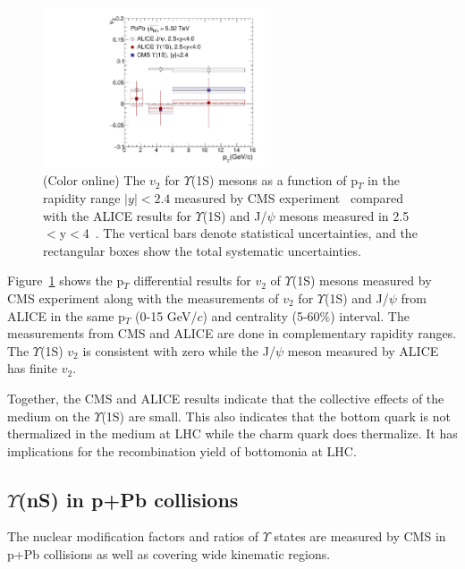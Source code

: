 \begin{figure}
  \begin{center}
\includegraphics[width=0.6\textwidth]{Figures/Fig11_CMS_ALICE_Y1S_5TeV_V2.pdf}
\caption{(Color online) The $v_{2}$ for $\Upsilon$(1S) mesons as a function of p$_{T}$ in the
  rapidity range $|y|<2.4$ measured by
  CMS experiment~\cite{CMS:2020efs} compared with the ALICE results for $\Upsilon$(1S)
  and J/$\psi$ mesons measured in 2.5$<$y$<$4~\cite{ALICE:2019pox}.
  The vertical bars denote statistical uncertainties,
  and the rectangular boxes show the total systematic uncertainties.
}
\label{fig:Upsilon1SV2Compare}
\end{center}
\end{figure}

Figure~\ref{fig:Upsilon1SV2Compare} shows the p$_{T}$ differential results
for $v_{2}$ of $\Upsilon$(1S) mesons measured by CMS experiment along with the
measurements of $v_{2}$ for $\Upsilon$(1S) and J/$\psi$ from ALICE in the same
p$_{T}$ (0-15 GeV/$c$) and centrality (5-60$\%$) interval. The measurements from CMS
and ALICE are done in complementary rapidity ranges. The $\Upsilon$(1S) $v_{2}$ is
consistent with zero while the J/$\psi$ meson measured by ALICE 
has finite $v_{2}$.

Together, the CMS and ALICE
results indicate that the collective effects of the medium on the 
$\Upsilon$(1S) are small. This also indicates that the bottom quark is not
thermalized in the medium at LHC while the charm quark does thermalize. It has
implications for the recombination yield of bottomonia at LHC. 



\subsection{$\Upsilon$(nS) in p+Pb collisions }
\label{sectionpA}

The nuclear modification factors and ratios of $\Upsilon$ states are measured by CMS
in p+Pb collisions as well as covering wide kinematic regions.

